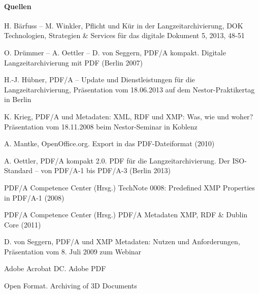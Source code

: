 \paragraph{Quellen}
\begin{flushleft}
H. Bärfuss -- M. Winkler, Pflicht und Kür in der Langzeitarchivierung, DOK Technologien, Strategien \& Services für das digitale Dokument 5, 2013, 48-51 
 
O. Drümmer -- A. Oettler -- D. von Seggern, PDF/A kompakt. Digitale Langzeitarchivierung mit PDF (Berlin 2007)  

H.-J. Hübner, PDF/A -- Update und Dienstleistungen für die Langzeitarchivierung, Präsentation vom 18.06.2013 auf dem Nestor-Praktikertag in Berlin 

K. Krieg, PDF/A und Metadaten: XML, RDF und XMP: Was, wie und woher? Präsentation vom 18.11.2008 beim Nestor-Seminar in Koblenz 

A. Mantke, OpenOffice.org. Export in das PDF-Dateiformat (2010)  

A. Oettler, PDF/A kompakt 2.0. PDF für die Langzeitarchivierung. Der ISO-Standard -- von PDF/A-1 bis PDF/A-3 (Berlin 2013) 

PDF/A Competence Center (Hrsg.) TechNote 0008: Predefined XMP Properties in PDF/A-1 (2008)   

PDF/A Competence Center (Hrsg.) PDF/A Metadaten XMP, RDF \& Dublin Core (2011) 

D. von Seggern, PDF/A und XMP Metadaten: Nutzen und Anforderungen, Präsentation vom 8. Juli 2009 zum Webinar  

Adobe Acrobat DC. Adobe PDF 

Open Format. Archiving of 3D Documents 


\end{flushleft}
